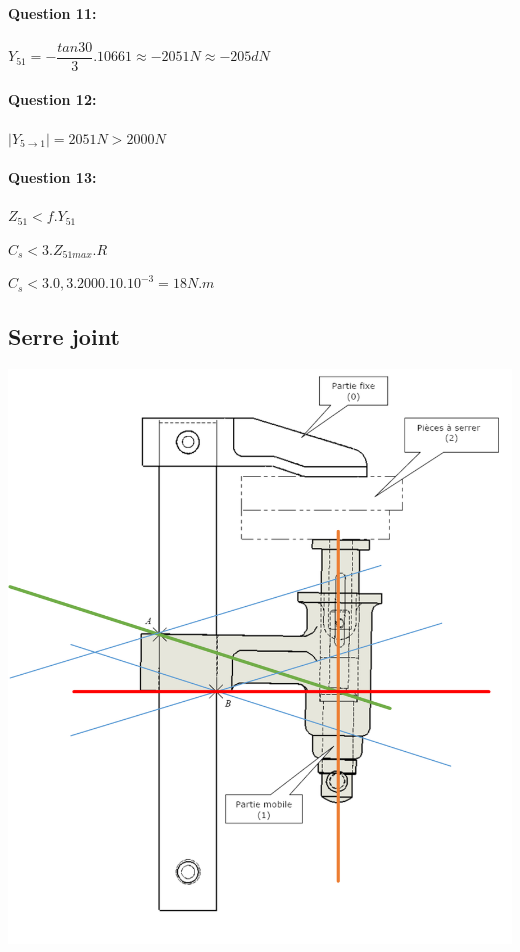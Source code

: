 \paragraph{Question 11:}

$Y_{51}=-\dfrac{tan 30}{3}.10661\approx -2051N\approx -205dN$

\paragraph{Question 12:}

$|Y_{5\rightarrow 1}|=2051N>2000N$

\paragraph{Question 13:}

$Z_{51}<f.Y_{51}$

$C_{s}<3.Z_{51max}.R$

$C_{s}<3.0,3.2000.10.10^{-3}=18N.m$

\subsection{Serre joint}

\begin{center}
 \includegraphics[width=0.8\linewidth]{img/graph_cor}
\end{center}

